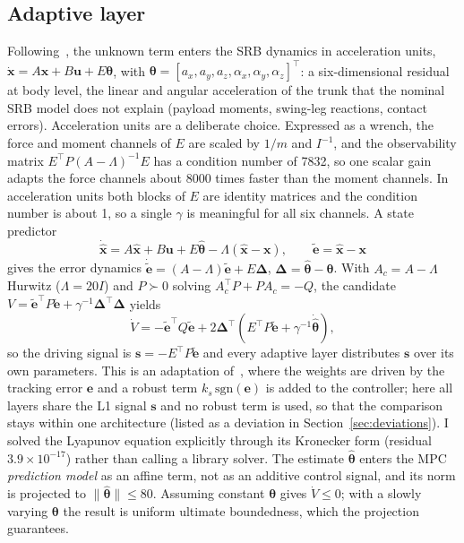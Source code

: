 \documentclass[conference]{IEEEtran}
\newcommand{\thetahat}{\hat{\bm\theta}}
\newcommand{\etilde}{\tilde{\bm e}}
\begin{document}
\subsection{Adaptive layer}\label{sec:adaptive}
Following~\cite{sombolestan2024}, the unknown term enters the SRB
dynamics in acceleration units,
$\dot{\bm x}=A\bm x+B\bm u+E\bm\theta$, with
$\bm\theta=[a_x,a_y,a_z,\alpha_x,\alpha_y,\alpha_z]^\top$: a
six-dimensional residual at body level, the linear and angular
acceleration of the trunk that the nominal SRB model does not explain
(payload moments, swing-leg reactions, contact errors). Acceleration
units are a deliberate choice. Expressed as a wrench, the force and
moment channels of $E$ are scaled by $1/m$ and $I^{-1}$, and the
observability matrix $E^\top P(A-\Lambda)^{-1}E$ has a condition number
of 7832, so one scalar gain adapts the force channels about 8000 times
faster than the moment channels. In acceleration units both blocks of
$E$ are identity matrices and the condition number is about 1, so a
single $\gamma$ is meaningful for all six channels. A state predictor
\begin{equation}
\dot{\hat{\bm x}}=A\hat{\bm x}+B\bm u+E\thetahat-\Lambda(\hat{\bm x}-\bm x),
\qquad \etilde=\hat{\bm x}-\bm x
\end{equation}
gives the error dynamics $\dot{\etilde}=(A-\Lambda)\etilde+E\bm\Delta$,
$\bm\Delta=\thetahat-\bm\theta$. With $A_c=A-\Lambda$ Hurwitz
($\Lambda=20I$) and $P\succ0$ solving $A_c^\top P+PA_c=-Q$, the
candidate $V=\etilde^\top P\etilde+\gamma^{-1}\bm\Delta^\top\bm\Delta$
yields
\begin{equation}
\dot V=-\etilde^\top Q\etilde
+2\bm\Delta^\top\!\left(E^\top P\etilde+\gamma^{-1}\dot{\thetahat}\right),
\end{equation}
so the driving signal is $\bm s=-E^\top P\etilde$ and every adaptive
layer distributes $\bm s$ over its own parameters. This is an adaptation
of~\cite{patil2022}, where the weights are driven by the tracking error
$\bm e$ and a robust term $k_s\,\mathrm{sgn}(\bm e)$ is added to the
controller; here all layers share the L1 signal $\bm s$ and no robust
term is used, so that the comparison stays within one architecture
(listed as a deviation in Section~\ref{sec:deviations}).
I solved the Lyapunov
equation explicitly through its Kronecker form (residual
$3.9\times10^{-17}$) rather than calling a library solver. The estimate
$\thetahat$ enters the MPC \emph{prediction model} as an affine term,
not as an additive control signal, and its norm is projected to
$\|\thetahat\|\le80$. Assuming constant $\bm\theta$ gives
$\dot V\le0$; with a slowly varying $\bm\theta$ the result is uniform
ultimate boundedness, which the projection guarantees.
\end{document}
